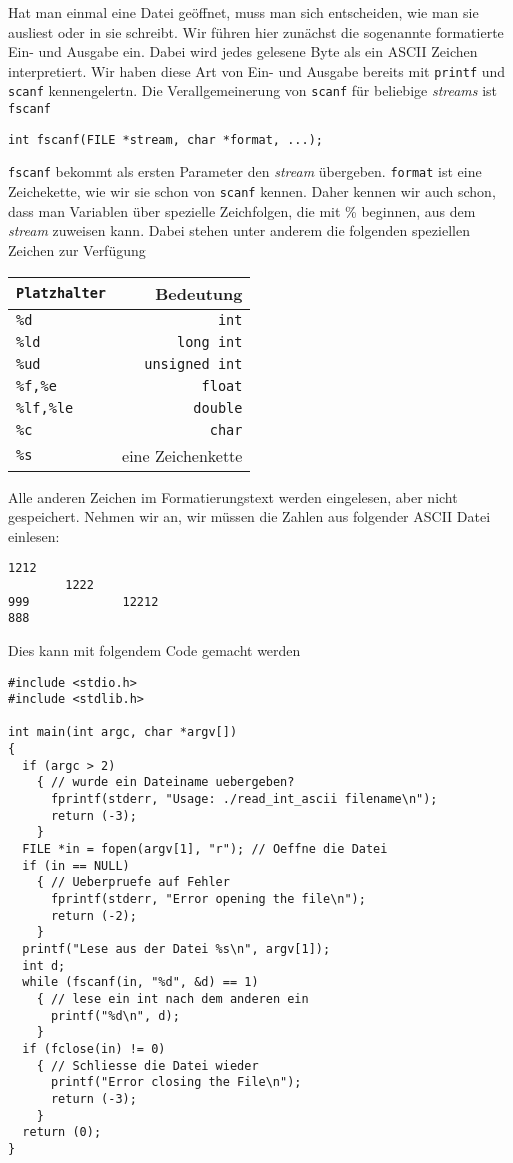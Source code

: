 Hat man einmal eine Datei geöffnet, muss man sich entscheiden, wie man sie ausliest oder in sie schreibt.
Wir führen hier zunächst die sogenannte formatierte Ein- und Ausgabe ein.
Dabei wird jedes gelesene Byte als ein ASCII Zeichen interpretiert.
Wir haben diese Art von Ein- und Ausgabe bereits mit \verb|printf| und \verb|scanf| kennengelertn.
Die Verallgemeinerung von \verb|scanf| für beliebige \emph{streams} ist \verb|fscanf|
\begin{lstlisting}
int fscanf(FILE *stream, char *format, ...);
\end{lstlisting}
\verb|fscanf| bekommt als ersten Parameter den \emph{stream} übergeben.
\verb|format| ist eine Zeichekette, wie wir sie schon von \verb|scanf| kennen.
Daher kennen wir auch schon, dass man Variablen über spezielle Zeichfolgen, die mit \% beginnen, aus dem \emph{stream} zuweisen kann.
Dabei stehen unter anderem die folgenden speziellen Zeichen zur Verfügung
\begin{center}
  \begin{tabular}{lr}
    \hline
    \texttt{Platzhalter} & Bedeutung \\\hline
    \texttt{\%d}	&  \texttt{int} \\
    \texttt{\%ld}  &  \texttt{long int} \\
    \texttt{\%ud}  &  \texttt{unsigned int} \\
    \texttt{\%f,\%e}   & \texttt{float} \\
    \texttt{\%lf,\%le}  & \texttt{double} \\
    \texttt{\%c}  & \texttt{char} \\
    \texttt{\%s}  & eine Zeichenkette\\
    \hline
  \end{tabular}
\end{center}
Alle anderen Zeichen im Formatierungstext werden eingelesen, aber nicht gespeichert. 
Nehmen wir an, wir müssen die Zahlen aus folgender ASCII Datei einlesen:
\begin{verbatim}
1212
        1222
999             12212
888
\end{verbatim}
Dies kann mit folgendem Code gemacht werden
\begin{lstlisting}
#include <stdio.h>
#include <stdlib.h>

int main(int argc, char *argv[])
{
  if (argc > 2)
    { // wurde ein Dateiname uebergeben?
      fprintf(stderr, "Usage: ./read_int_ascii filename\n");
      return (-3);
    }
  FILE *in = fopen(argv[1], "r"); // Oeffne die Datei
  if (in == NULL)
    { // Ueberpruefe auf Fehler
      fprintf(stderr, "Error opening the file\n");
      return (-2);
    }
  printf("Lese aus der Datei %s\n", argv[1]);
  int d;
  while (fscanf(in, "%d", &d) == 1)
    { // lese ein int nach dem anderen ein
      printf("%d\n", d);
    }
  if (fclose(in) != 0)
    { // Schliesse die Datei wieder
      printf("Error closing the File\n");
      return (-3);
    }
  return (0);
}
\end{lstlisting}
